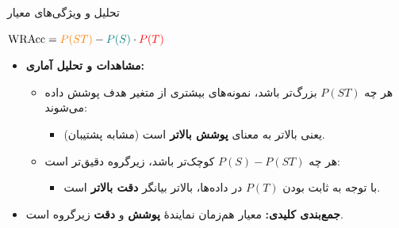 \begin{frame}{تحلیل و ویژگی‌های معیار }{}
\begin{flushleft}
\begin{latin}
\normalsize\bfseries
$\mathrm{WRAcc} = {\color{orange}P(ST)} - {\color{teal}P(S)} \cdot {\color{red}P(T)}$
\end{latin}
\end{flushleft}

\begin{itemize}\setlength{\itemsep}{5pt}
    \item \textbf{مشاهدات و تحلیل آماری:}
    \begin{itemize}\setlength{\itemsep}{2pt}
        \item هر چه $P(ST)$ بزرگ‌تر باشد، نمونه‌های بیشتری از متغیر هدف پوشش داده می‌شوند:
        \begin{itemize}\footnotesize
            \item یعنی  بالاتر به معنای \textbf{پوشش بالاتر}  است (مشابه پشتیبان).
        \end{itemize}
        \item هر چه $P(S) - P(ST)$ کوچک‌تر باشد، زیرگروه دقیق‌تر است:
        \begin{itemize}\footnotesize
            \item با توجه به ثابت بودن $P(T)$ در داده‌ها،  بالاتر بیانگر \textbf{دقت بالاتر} است.
        \end{itemize}
    \end{itemize}
    \item \alert{\textbf{جمع‌بندی کلیدی:}} معیار  هم‌زمان نمایندهٔ \textbf{پوشش}  و \textbf{دقت}  زیرگروه است.
\end{itemize}
\end{frame}


